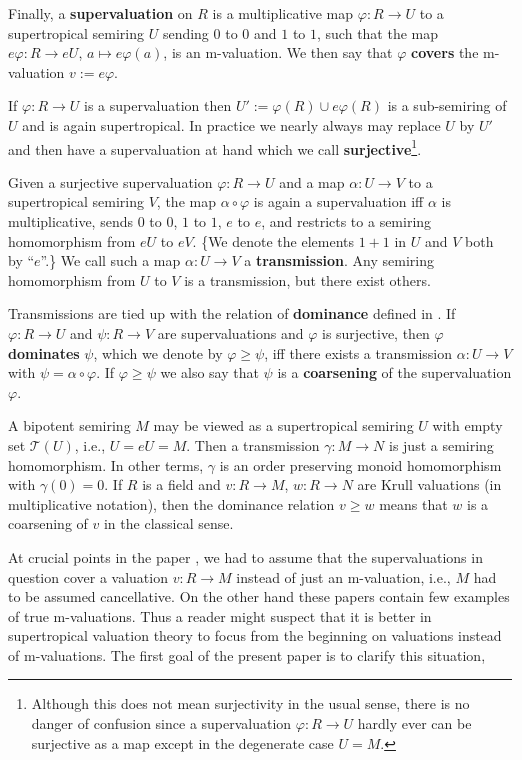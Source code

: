 \documentclass [12pt,a4paper,reqno]{amsart}
\begin{document}
Finally, a \textbf{supervaluation} on $R$ is a multiplicative map
${\varphi}: R \to U$ to a supertropical semiring $U$ sending $0$ to $0$
and $1$ to $1$, such that the map $e {\varphi} : R \to eU$, $a \mapsto
e {\varphi}(a)$, is an {m}-valuation. We then say that ${\varphi}$
\textbf{covers} the {m}-valuation  $v:= e{\varphi}$.

If ${\varphi}: R \to U$ is a  supervaluation  then $U' := {\varphi}(R) \cup
e {\varphi}(R)$ is a sub-semiring of $U$ and is again supertropical. In
practice we nearly always may replace $U$ by $U'$ and then have a
supervaluation at hand which we call
\textbf{surjective}\footnote{Although this does not mean
surjectivity in the usual sense, there is no danger of confusion
since a supervaluation ${\varphi}:R \to U$ hardly  ever can be
surjective as a map except in the degenerate case $U=M$.}.

Given a surjective supervaluation ${\varphi}: R \to U$ and a map ${\alpha}:U
\to V$ to a supertropical semiring $V$, the map ${\alpha} \circ {\varphi}$
is again a supervaluation iff ${\alpha}$ is multiplicative, sends $0$
to $0$, $1$ to $1$, $e$ to $e$, and restricts to a semiring
homomorphism from $eU$ to $eV$. \{We denote the elements $1+1$ in
$U$ and $V$ both by ``$e$''.\} We call such a map ${\alpha}: U \to V$ a
\textbf{transmission}. Any semiring homomorphism from $U$ to $V$
is a transmission, but there exist others.

 Transmissions are tied up with the relation of
\textbf{dominance} defined in \cite[\S5]{IKR1}. If ${\varphi}: R \to U
$ and $\psi: R \to V$ are supervaluations and ${\varphi}$ is
surjective, then ${\varphi}$ \textbf{dominates} $\psi$, which we denote
by ${\varphi} \geq \psi$, iff there exists a transmission ${\alpha}: U \to
V$ with $\psi ={\alpha} \circ {\varphi}$. If ${\varphi} \geq \psi$ we also say
that $\psi$ is a \textbf{coarsening} of the supervaluation ${\varphi}$.

A bipotent semiring $M$ may be viewed as a supertropical semiring
$U$ with empty set ${\mathcal T}(U)$, i.e., $U = eU =M$. Then a
transmission ${\gamma}: M \to N$ is just a semiring homomorphism.  In
other terms, ${\gamma}$  is an order preserving monoid homomorphism
with ${\gamma}(0) =0$. If $R$ is a field and $v: R\to M$, $w: R \to N$
are Krull valuations (in multiplicative notation), then the
dominance relation $v \geq w$  means that $w$ is a coarsening of
$v$ in the classical sense.

At crucial points in the paper \cite{IKR1}, \cite{IKR2} we had to
assume that the supervaluations in question cover a valuation $v:
R \to M$ instead of just an {m}-valuation, i.e., $M$  had to be
assumed cancellative. On the other hand these papers contain few
examples of true {m}-valuations. Thus a reader might suspect that
it is better in supertropical valuation theory to focus from the
beginning on valuations instead of {m}-valuations. The first goal
of the present paper is to clarify this situation,
\end{document}
